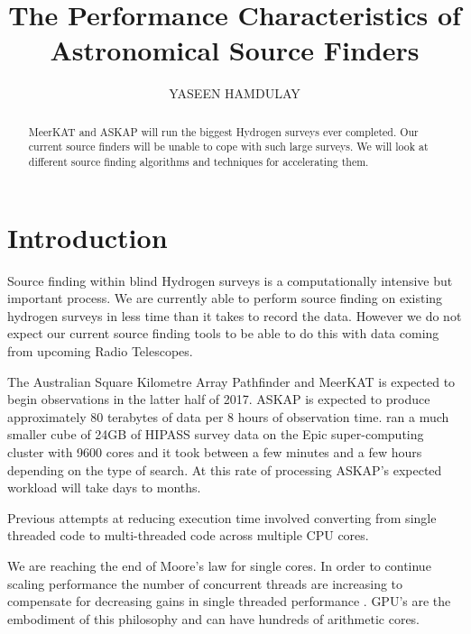 \documentclass[prodmode,acmtecs]{acmsmall} \usepackage[ruled]{algorithm2e}
\begin{document}
\title{The Performance Characteristics of Astronomical Source Finders}
\author{YASEEN HAMDULAY
}

\begin{abstract}
MeerKAT and ASKAP will run the biggest Hydrogen surveys ever completed. Our current source
finders will be unable to cope with such large surveys. We will look at different source
finding algorithms and techniques for accelerating them.
\end{abstract}



\maketitle

\section{Introduction}
Source finding within blind Hydrogen surveys is a computationally intensive but important process.
We are currently able to perform source finding on existing hydrogen surveys in less time than it takes
to record the data. However we do not expect our current source finding tools to be able to do this with
data coming from upcoming Radio Telescopes. 

The Australian Square Kilometre Array Pathfinder and MeerKAT is expected to begin observations in the latter
half of 2017. ASKAP is expected to produce approximately 80 terabytes of data per 8 hours of 
observation time. \cite{whiting2012source} ran a much smaller cube of 24GB of HIPASS \cite{wong2006northern}
 survey data on the Epic super-computing
cluster with 9600 cores and it took between a few minutes and a few hours depending on the
type of search. At this rate of processing ASKAP's expected workload will take days to months. 

Previous attempts at reducing execution time involved converting from single threaded code
to multi-threaded code across multiple CPU cores. \cite{scott} 

We are reaching the end of Moore's law for single cores. In order to continue scaling performance
the number of concurrent threads are increasing to compensate for decreasing gains in single
threaded performance \cite{michalakes2008gpu}. GPU's are the embodiment of this philosophy
and can have hundreds of arithmetic cores. 
\end{document}
